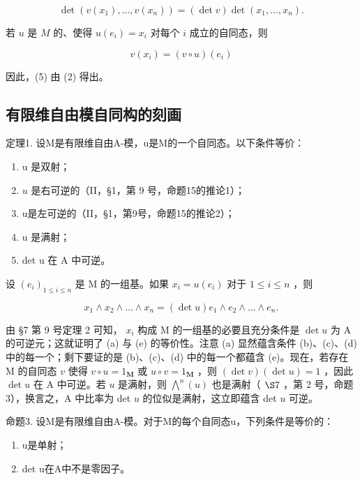 \[
\det (v (x _ {1}), \dots , v (x _ {n})) = (\det v) \det (x _ {1}, \dots , x _ {n}).\tag{5}
\]

若 \(u\) 是 \(M\) 的、使得 \(u(e_i) = x_i\) 对每个 \(i\) 成立的自同态，则

\[
v (x _ {i}) = (v \circ u) (e _ {i})
\]

因此，(5) 由 (2) 得出。

\subsection{有限维自由模自同构的刻画}

定理1. 设M是有限维自由A-模，u是M的一个自同态。以下条件等价：

\begin{enumerate}
\def\labelenumi{(\alph{enumi})}
\item
  u 是双射；
\item
  \(u\) 是右可逆的（II，§1，第 9 号，命题15的推论1）；
\item
  u是左可逆的（II，§1，第9号，命题15的推论2）；
\item
  u 是满射；
\item
  det u 在 A 中可逆。
\end{enumerate}

设 \((e_i)_{1\leqslant i\leqslant n}\) 是 M 的一组基。如果 \(x_{i} = u(e_{i})\) 对于 \(1\leqslant i\leqslant n\) ，则

\[
x _ {1} \wedge x _ {2} \wedge \dots \wedge x _ {n} = (\det u) e _ {1} \wedge e _ {2} \wedge \dots \wedge e _ {n}.
\]

由 §7 第 9 号定理 2 可知， \(x_{i}\) 构成 M 的一组基的必要且充分条件是 \(\det u\) 为 A 的可逆元；这就证明了 (a) 与 (e) 的等价性。注意 (a) 显然蕴含条件 (b)、(c)、(d) 中的每一个；剩下要证的是 (b)、(c)、(d) 中的每一个都蕴含 (e)。现在，若存在 M 的自同态 \(v\) 使得 \(v \circ u = 1_{\mathbf{M}}\) 或 \(u \circ v = 1_{\mathbf{M}}\) ，则 \((\det v)(\det u) = 1\) ，因此 \(\det u\) 在 A 中可逆。若 \(u\) 是满射，则 \(\bigwedge^{n}(u)\) 也是满射（ \(\S 7\) ，第 2 号，命题 3），换言之，A 中比率为 det \(u\) 的位似是满射，这立即蕴含 det \(u\) 可逆。

命题3. 设M是有限维自由A-模。对于M的每个自同态u，下列条件是等价的：

\begin{enumerate}
\def\labelenumi{(\alph{enumi})}
\setcounter{enumi}{5}
\item
  u是单射；
\item
  det u在A中不是零因子。
\end{enumerate}

